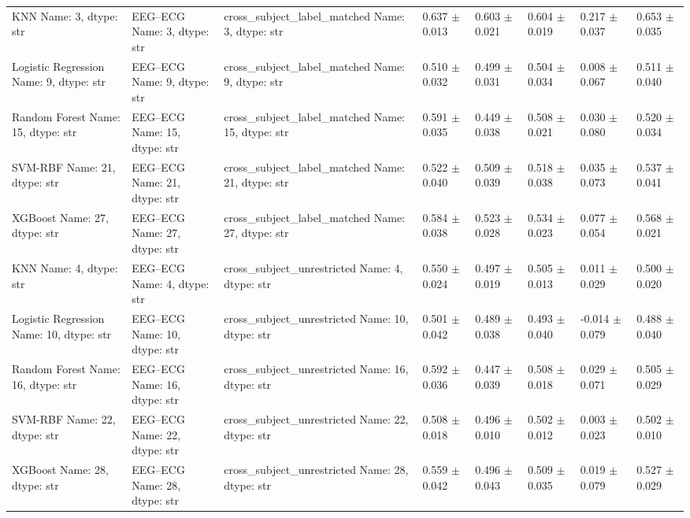\begin{table}[!t]
\begin{tabular}{llllllll}
    KNN
Name: 3, dtype: str &     EEG--ECG
Name: 3, dtype: str &     cross_subject_label_matched
Name: 3, dtype: str & 0.637 $\pm$ 0.013 & 0.603 $\pm$ 0.021 & 0.604 $\pm$ 0.019 & 0.217 $\pm$ 0.037 & 0.653 $\pm$ 0.035 \\
    Logistic Regression
Name: 9, dtype: str &     EEG--ECG
Name: 9, dtype: str &     cross_subject_label_matched
Name: 9, dtype: str & 0.510 $\pm$ 0.032 & 0.499 $\pm$ 0.031 & 0.504 $\pm$ 0.034 & 0.008 $\pm$ 0.067 & 0.511 $\pm$ 0.040 \\
    Random Forest
Name: 15, dtype: str &     EEG--ECG
Name: 15, dtype: str &     cross_subject_label_matched
Name: 15, dtype: str & 0.591 $\pm$ 0.035 & 0.449 $\pm$ 0.038 & 0.508 $\pm$ 0.021 & 0.030 $\pm$ 0.080 & 0.520 $\pm$ 0.034 \\
    SVM-RBF
Name: 21, dtype: str &     EEG--ECG
Name: 21, dtype: str &     cross_subject_label_matched
Name: 21, dtype: str & 0.522 $\pm$ 0.040 & 0.509 $\pm$ 0.039 & 0.518 $\pm$ 0.038 & 0.035 $\pm$ 0.073 & 0.537 $\pm$ 0.041 \\
    XGBoost
Name: 27, dtype: str &     EEG--ECG
Name: 27, dtype: str &     cross_subject_label_matched
Name: 27, dtype: str & 0.584 $\pm$ 0.038 & 0.523 $\pm$ 0.028 & 0.534 $\pm$ 0.023 & 0.077 $\pm$ 0.054 & 0.568 $\pm$ 0.021 \\
    KNN
Name: 4, dtype: str &     EEG--ECG
Name: 4, dtype: str &     cross_subject_unrestricted
Name: 4, dtype: str & 0.550 $\pm$ 0.024 & 0.497 $\pm$ 0.019 & 0.505 $\pm$ 0.013 & 0.011 $\pm$ 0.029 & 0.500 $\pm$ 0.020 \\
    Logistic Regression
Name: 10, dtype: str &     EEG--ECG
Name: 10, dtype: str &     cross_subject_unrestricted
Name: 10, dtype: str & 0.501 $\pm$ 0.042 & 0.489 $\pm$ 0.038 & 0.493 $\pm$ 0.040 & -0.014 $\pm$ 0.079 & 0.488 $\pm$ 0.040 \\
    Random Forest
Name: 16, dtype: str &     EEG--ECG
Name: 16, dtype: str &     cross_subject_unrestricted
Name: 16, dtype: str & 0.592 $\pm$ 0.036 & 0.447 $\pm$ 0.039 & 0.508 $\pm$ 0.018 & 0.029 $\pm$ 0.071 & 0.505 $\pm$ 0.029 \\
    SVM-RBF
Name: 22, dtype: str &     EEG--ECG
Name: 22, dtype: str &     cross_subject_unrestricted
Name: 22, dtype: str & 0.508 $\pm$ 0.018 & 0.496 $\pm$ 0.010 & 0.502 $\pm$ 0.012 & 0.003 $\pm$ 0.023 & 0.502 $\pm$ 0.010 \\
    XGBoost
Name: 28, dtype: str &     EEG--ECG
Name: 28, dtype: str &     cross_subject_unrestricted
Name: 28, dtype: str & 0.559 $\pm$ 0.042 & 0.496 $\pm$ 0.043 & 0.509 $\pm$ 0.035 & 0.019 $\pm$ 0.079 & 0.527 $\pm$ 0.029 \\
\bottomrule
\end{tabular}
\end{table}

